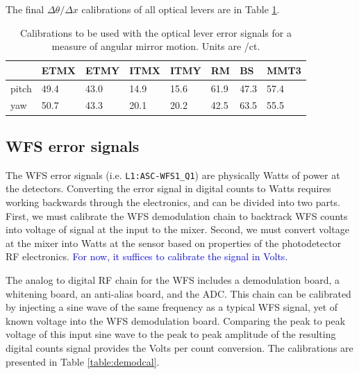 The final $\Delta\theta / \Delta x$ calibrations of all optical levers
are in Table \ref{table:oplevcal}. 

\begin{table}
\centering
\caption[Optical lever calibrations]{Calibrations to be used
  with the optical lever error signals 
  for a measure of angular mirror motion. Units are \microrad/ct.}
\begin{tabular}{l l l l l l l l}
\hline
        & ETMX & ETMY & ITMX & ITMY & RM & BS & MMT3 \\
\hline
pitch & 49.4 & 43.0 & 14.9 & 15.6 & 61.9 & 47.3 & 57.4 \\
yaw & 50.7 & 43.3 & 20.1 & 20.2 & 42.5 & 63.5 & 55.5 \\
\hline
\end{tabular}
\label{table:oplevcal}
\end{table}





\subsection{WFS error signals}
The WFS error signals (i.e. \texttt{L1:ASC-WFS1\_Q1}) are physically
Watts of power at the detectors. Converting the error signal in
digital counts to Watts requires working backwards through the
electronics, and can be divided into two parts. First, we must
calibrate the WFS demodulation chain to backtrack WFS counts into
voltage of signal at the input to the mixer. Second, we must convert
voltage at the mixer into Watts at the sensor based on properties of
the photodetector RF electronics. \textcolor{blue}{For now, it
  suffices to calibrate the signal in Volts.}

The analog to digital RF chain for the WFS includes a demodulation
board, a whitening board, an anti-alias board, and the ADC. This chain
can be calibrated by injecting a sine wave of the same frequency as a
typical WFS signal, yet of known voltage into the WFS demodulation
board. Comparing the peak to peak voltage of this input sine wave to
the peak to peak amplitude of the resulting digital counts signal
provides the Volts per count conversion. The calibrations are
presented in Table \ref{table:demodcal}.

